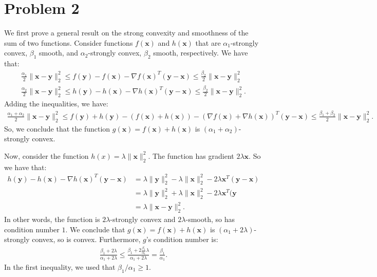 \documentclass[11pt]{article}
\newcommand{\bv}[1]{\mathbf{#1}}
\begin{document}
	\section*{Problem 2}
	We first prove a general result on the strong convexity and smoothness of the sum of two functions.
	Consider functions $f(\bv{x})$ and $h(\bv{x})$ that are $\alpha_1$-strongly convex, $\beta_1$ smooth, and  $\alpha_2$-strongly convex, $\beta_2$ smooth, respectively. We have that:
	\begin{align*}
		\frac{\alpha_1}{2}\|\bv{x} - \bv{y}\|_2^2 \leq f(\bv{y}) - f(\bv{x}) - \nabla f(\bv{x})^T(\bv{y} - \bv{x}) \leq \frac{\beta_2}{2}\|\bv{x} - \bv{y}\|_2^2 \\
		\frac{\alpha_2}{2}\|\bv{x} - \bv{y}\|_2^2 \leq h(\bv{y}) - h(\bv{x}) - \nabla h(\bv{x})^T(\bv{y} - \bv{x}) \leq \frac{\beta_2}{2}\|\bv{x} - \bv{y}\|_2^2.
	\end{align*}
	Adding the inequalities, we have:
	\begin{align*}
		\frac{\alpha_1 + \alpha_2}{2}\|\bv{x} - \bv{y}\|_2^2 \leq f(\bv{y}) + h(\bv{y}) - (f(\bv{x}) + h(\bv{x})) - (\nabla f(\bv{x}) + \nabla h(\bv{x}) )^T(\bv{y} - \bv{x}) \leq 	\frac{\beta_1 + \beta_2}{2}\|\bv{x} - \bv{y}\|_2^2.
	\end{align*}
	So, we conclude that the function $g(\bv{x}) = f(\bv{x}) + h(\bv{x})$ is $(\alpha_1 + \alpha_2)$-strongly convex. 

	Now, consider the function $h(x) = \lambda \|\bv{x}\|_2^2$. The function has gradient $2\lambda \bv{x}$. So we have that:
	\begin{align*}
		h(\bv{y}) - h(\bv{x}) - \nabla h(\bv{x})^T(\bv{y} - \bv{x}) &= \lambda\|\bv{y}\|_2^2 - \lambda\|\bv{x}\|_2^2 - 2\lambda \bv{x}^T(\bv{y} - \bv{x})\\
		 &= \lambda\|\bv{y}\|_2^2 + \lambda\|\bv{x}\|_2^2 - 2\lambda\bv{x}^T(\bv{y}\\
		&= \lambda \|\bv{x} - \bv{y}\|_2^2. 
	\end{align*}
	In other words, the function is $2\lambda$-strongly convex and $2\lambda$-smooth, so has condition number $1$. We conclude that $g(\bv{x}) = f(\bv{x}) + h(\bv{x})$ is $(\alpha_1 + 2\lambda)$-strongly convex, so is convex. Furthermore, $g$'s condition number is:
	\begin{align*}
		\frac{\beta_1 + 2\lambda}{\alpha_1 + 2\lambda} \leq \frac{\beta_1 + 2\frac{\beta_1}{\alpha_1}\lambda}{\alpha_1 + 2\lambda} = \frac{\beta_1}{\alpha_1}.
	\end{align*}
	In the first inequality, we used that $\beta_1/\alpha_1 \geq 1$. 
\end{document}
